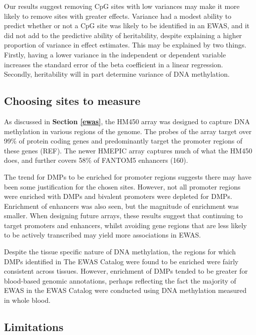 \documentclass[11pt,oneside]{bristolthesis}
\begin{document}
Our results suggest removing CpG sites with low variances may make it more likely to remove sites with greater effects. Variance had a modest ability to predict whether or not a CpG site was likely to be identified in an EWAS, and it did not add to the predictive ability of heritability, despite explaining a higher proportion of variance in effect estimates. This may be explained by two things. Firstly, having a lower variance in the independent or dependent variable increases the standard error of the beta coefficient in a linear regression. Secondly, heritability will in part determine variance of DNA methylation.

\hypertarget{choosing-sites-to-measure}{%
\subsection{Choosing sites to measure}\label{choosing-sites-to-measure}}

As discussed in \textbf{Section \ref{ewas}}, the HM450 array was designed to capture DNA methylation in various regions of the genome. The probes of the array target over 99\% of protein coding genes and predominantly target the promoter regions of these genes (REF). The newer HMEPIC array captures much of what the HM450 does, and further covers 58\% of FANTOM5 enhancers (160).

The trend for DMPs to be enriched for promoter regions suggests there may have been some justification for the chosen sites. However, not all promoter regions were enriched with DMPs and bivalent promoters were depleted for DMPs. Enrichment of enhancers was also seen, but the magnitude of enrichment was smaller. When designing future arrays, these results suggest that continuing to target promoters and enhancers, whilst avoiding gene regions that are less likely to be actively transcribed may yield more associations in EWAS.

Despite the tissue specific nature of DNA methylation, the regions for which DMPs identified in The EWAS Catalog were found to be enriched were fairly consistent across tissues. However, enrichment of DMPs tended to be greater for blood-based genomic annotations, perhaps reflecting the fact the majority of EWAS in the EWAS Catalog were conducted using DNA methylation measured in whole blood.

\hypertarget{limitations-04}{%
\subsection{Limitations}\label{limitations-04}}
\end{document}
